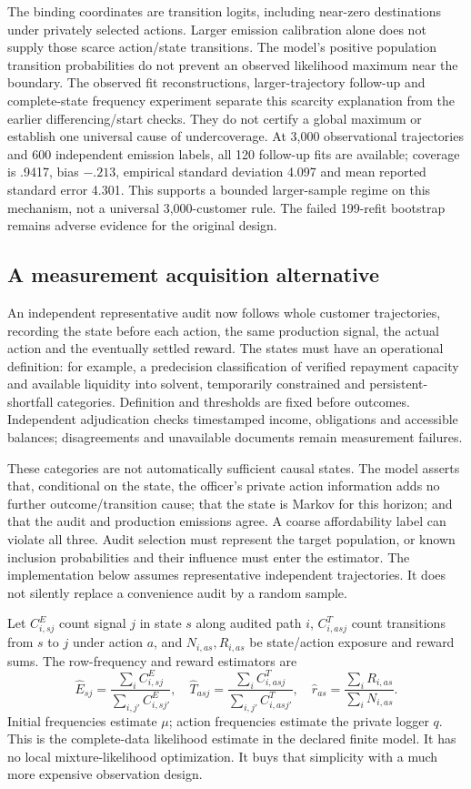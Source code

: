 The binding coordinates are transition logits, including near-zero
destinations under privately selected actions. Larger emission calibration
alone does not supply those scarce action/state transitions. The model's
positive population transition probabilities do not prevent an observed
likelihood maximum near the boundary. The observed fit reconstructions,
larger-trajectory follow-up and complete-state frequency experiment separate
this scarcity explanation from the earlier differencing/start checks. They
do not certify a global maximum or establish one universal cause of
undercoverage. At 3,000 observational trajectories and 600 independent
emission labels, all 120 follow-up fits are available; coverage is .9417,
bias $-.213$, empirical standard deviation 4.097 and mean reported standard
error 4.301. This supports a bounded larger-sample regime on this mechanism,
not a universal 3,000-customer rule. The failed 199-refit bootstrap remains
adverse evidence for the original design.

\subsection{A measurement acquisition alternative}
An independent representative audit now follows whole customer trajectories,
recording the state before each action, the same production signal, the
actual action and the eventually settled reward. The states must have an
operational definition: for example, a predecision classification of verified
repayment capacity and available liquidity into solvent, temporarily
constrained and persistent-shortfall categories. Definition and thresholds
are fixed before outcomes. Independent adjudication checks timestamped
income, obligations and accessible balances; disagreements and unavailable
documents remain measurement failures.

These categories are not automatically sufficient causal states. The model
asserts that, conditional on the state, the officer's private action
information adds no further outcome/transition cause; that the state is
Markov for this horizon; and that the audit and production emissions agree.
A coarse affordability label can violate all three. Audit selection must
represent the target population, or known inclusion probabilities and their
influence must enter the estimator. The implementation below assumes
representative independent trajectories. It does not silently replace a
convenience audit by a random sample.

Let $C_{i,sj}^E$ count signal $j$ in state $s$ along audited path $i$,
$C_{i,asj}^T$ count transitions from $s$ to $j$ under action $a$, and
$N_{i,as},R_{i,as}$ be state/action exposure and reward sums. The row-frequency
and reward estimators are
\[
 \hat E_{sj}=\frac{\sum_i C_{i,sj}^E}{\sum_{i,j'}C_{i,sj'}^E},\quad
 \hat T_{asj}=\frac{\sum_i C_{i,asj}^T}{\sum_{i,j'}C_{i,asj'}^T},\quad
 \hat r_{as}=\frac{\sum_iR_{i,as}}{\sum_iN_{i,as}}.
\]
Initial frequencies estimate $\mu$; action frequencies estimate the private
logger $q$. This is the complete-data likelihood estimate in the declared
finite model. It has no local mixture-likelihood optimization. It buys that
simplicity with a much more expensive observation design.

